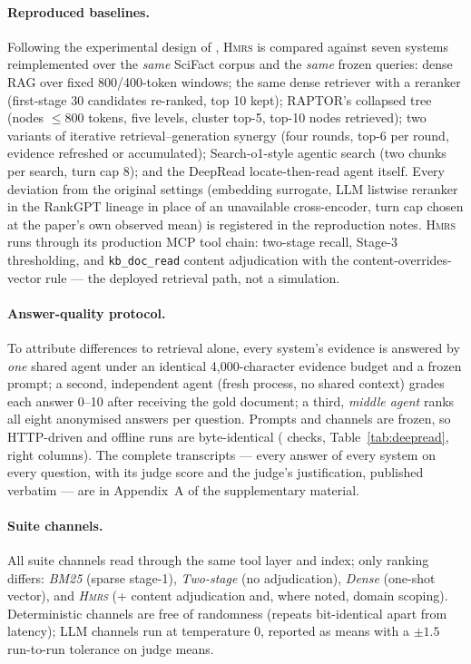 \documentclass[sigconf, review, anonymous]{acmart}
\newcommand{\sys}{\textsc{Hmrs}}
\begin{document}
\paragraph{Reproduced baselines.} Following the experimental design of
\cite{li2026deepread}, \sys{} is compared against seven systems reimplemented
over the \emph{same} SciFact corpus and the \emph{same} frozen queries: dense
RAG over fixed 800/400-token windows; the same dense retriever with a reranker
(first-stage 30 candidates re-ranked, top 10 kept); RAPTOR's collapsed tree
(nodes $\le$800 tokens, five levels, cluster top-5, top-10 nodes retrieved);
two variants of iterative retrieval--generation synergy (four rounds, top-6
per round, evidence refreshed or accumulated); Search-o1-style agentic search
(two chunks per search, turn cap 8); and the DeepRead locate-then-read agent
itself. Every deviation from the original settings (embedding surrogate, LLM
listwise reranker in the RankGPT lineage \cite{sun2023rankgpt} in place of an
unavailable cross-encoder, turn cap chosen at the paper's own observed mean)
is registered in the reproduction notes.
\sys{} runs through its production MCP tool chain: two-stage recall, Stage-3
thresholding, and \texttt{kb\_doc\_read} content adjudication with the
content-overrides-vector rule --- the deployed retrieval path, not a
simulation.

\paragraph{Answer-quality protocol.} To attribute differences to retrieval
alone, every system's evidence is answered by \emph{one} shared agent under an
identical 4{,}000-character evidence budget and a frozen prompt; a second,
independent agent (fresh process, no shared context) grades each answer 0--10
after receiving the gold document; a third, \emph{middle agent} ranks all
eight anonymised answers per question. Prompts and channels are frozen, so
HTTP-driven and offline runs are byte-identical (\apiconsist{} checks,
Table~\ref{tab:deepread}, right columns). The complete
transcripts --- every answer of every system on every question, with its
judge score and the judge's justification, published verbatim --- are in
Appendix~A of the supplementary material.

\paragraph{Suite channels.} All suite channels read through the same tool
layer and index; only ranking differs: \emph{BM25} (sparse stage-1),
\emph{Two-stage} (no adjudication), \emph{Dense} (one-shot vector), and
\emph{\sys{}} (+ content adjudication and, where noted, domain scoping).
Deterministic channels are free of randomness (repeats bit-identical apart
from latency); LLM channels run at temperature $0$, reported as means with a
$\pm1.5$ run-to-run tolerance on judge means.
\end{document}
